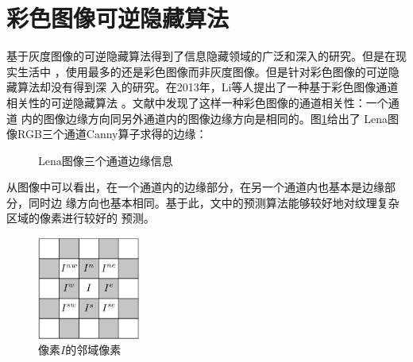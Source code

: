 \section{彩色图像可逆隐藏算法}
基于灰度图像的可逆隐藏算法得到了信息隐藏领域的广泛和深入的研究。但是在现实生活中
，使用最多的还是彩色图像而非灰度图像。但是针对彩色图像的可逆隐藏算法却没有得到深
入的研究。在2013年，Li等人提出了一种基于彩色图像通道相关性的可逆隐藏算法
\cite{li2013reversible}。文献中发现了这样一种彩色图像的通道相关性：一个通道
内的图像边缘方向同另外通道内的图像边缘方向是相同的。图\ref{fig:lena_canny}给出了
Lena图像RGB三个通道Canny算子求得的边缘：
\begin{figure}[!hbt]
\centering 
{}
\caption{Lena图像三个通道边缘信息}
\label{fig:lena_canny}
\end{figure}
从图像中可以看出，在一个通道内的边缘部分，在另一个通道内也基本是边缘部分，同时边
缘方向也基本相同。基于此，文中的预测算法能够较好地对纹理复杂区域的像素进行较好的
预测。
\begin{figure}
  \centering
  \includegraphics[width=0.3\textwidth]{figures/pixel_neighbourhood.eps}
  \caption{像素$I$的邻域像素}
  \label{fig:pixel_neighbour}
\end{figure}
